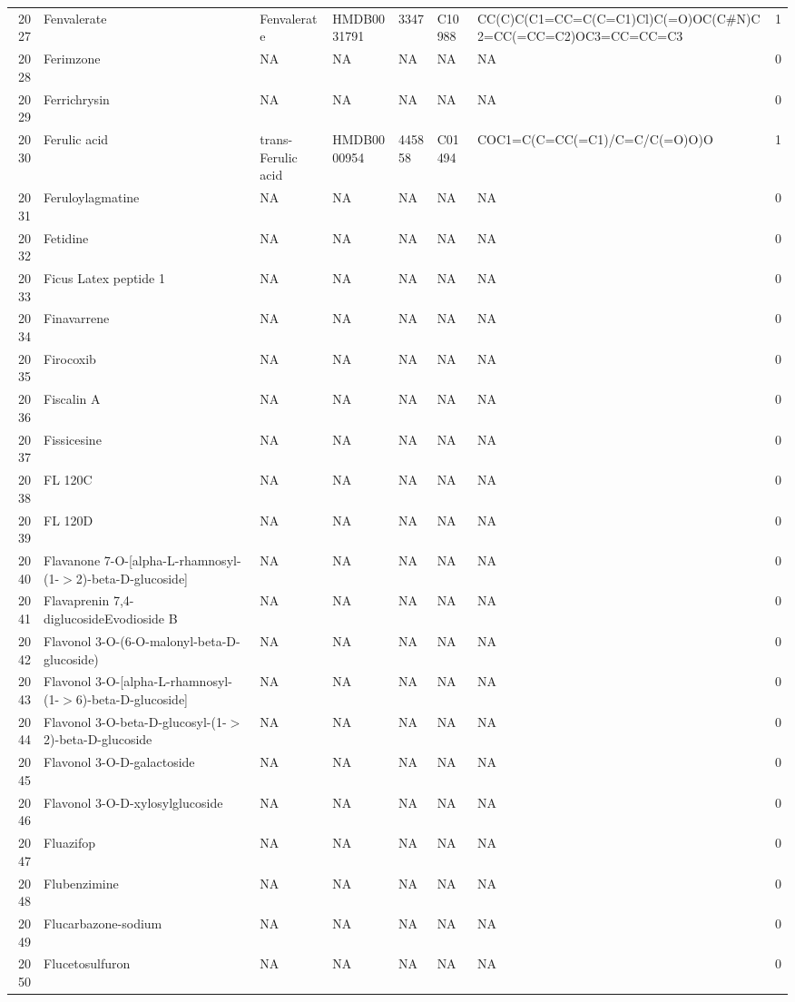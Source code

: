 \documentclass[a4paper]{article}
\begin{document}
\begin{longtable}{rlllllll}
  2027 & Fenvalerate & Fenvalerate & HMDB0031791 & 3347 & C10988 & CC(C)C(C1=CC=C(C=C1)Cl)C(=O)OC(C\#N)C2=CC(=CC=C2)OC3=CC=CC=C3 & 1 \\ 
  2028 & Ferimzone & NA & NA & NA & NA & NA & 0 \\ 
  2029 & Ferrichrysin & NA & NA & NA & NA & NA & 0 \\ 
  2030 & Ferulic acid & trans-Ferulic acid & HMDB0000954 & 445858 & C01494 & COC1=C(C=CC(=C1)/C=C/C(=O)O)O & 1 \\ 
  2031 & Feruloylagmatine & NA & NA & NA & NA & NA & 0 \\ 
  2032 & Fetidine & NA & NA & NA & NA & NA & 0 \\ 
  2033 & Ficus Latex peptide 1 & NA & NA & NA & NA & NA & 0 \\ 
  2034 & Finavarrene & NA & NA & NA & NA & NA & 0 \\ 
  2035 & Firocoxib & NA & NA & NA & NA & NA & 0 \\ 
  2036 & Fiscalin A & NA & NA & NA & NA & NA & 0 \\ 
  2037 & Fissicesine & NA & NA & NA & NA & NA & 0 \\ 
  2038 & FL 120C & NA & NA & NA & NA & NA & 0 \\ 
  2039 & FL 120D & NA & NA & NA & NA & NA & 0 \\ 
  2040 & Flavanone 7-O-[alpha-L-rhamnosyl-(1-$>$2)-beta-D-glucoside] & NA & NA & NA & NA & NA & 0 \\ 
  2041 & Flavaprenin 7,4-diglucosideEvodioside B & NA & NA & NA & NA & NA & 0 \\ 
  2042 & Flavonol 3-O-(6-O-malonyl-beta-D-glucoside) & NA & NA & NA & NA & NA & 0 \\ 
  2043 & Flavonol 3-O-[alpha-L-rhamnosyl-(1-$>$6)-beta-D-glucoside] & NA & NA & NA & NA & NA & 0 \\ 
  2044 & Flavonol 3-O-beta-D-glucosyl-(1-$>$2)-beta-D-glucoside & NA & NA & NA & NA & NA & 0 \\ 
  2045 & Flavonol 3-O-D-galactoside & NA & NA & NA & NA & NA & 0 \\ 
  2046 & Flavonol 3-O-D-xylosylglucoside & NA & NA & NA & NA & NA & 0 \\ 
  2047 & Fluazifop & NA & NA & NA & NA & NA & 0 \\ 
  2048 & Flubenzimine & NA & NA & NA & NA & NA & 0 \\ 
  2049 & Flucarbazone-sodium & NA & NA & NA & NA & NA & 0 \\ 
  2050 & Flucetosulfuron & NA & NA & NA & NA & NA & 0 \\ 

\end{longtable}
\end{document}
